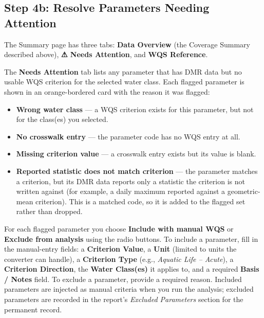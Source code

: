\documentclass[
  11pt,
  letterpaper,
  DIV=11,
  numbers=noendperiod]{scrartcl}
\providecommand{\tightlist}{%
  \setlength{\itemsep}{0pt}\setlength{\parskip}{0pt}}
\begin{document}
\subsection{Step 4b: Resolve Parameters Needing
Attention}\label{sec-needs-attention}

The Summary page has three tabs: \textbf{Data Overview} (the Coverage
Summary described above), \textbf{⚠ Needs Attention}, and \textbf{WQS
Reference}.

The \textbf{Needs Attention} tab lists any parameter that has DMR data
but no usable WQS criterion for the selected water class. Each flagged
parameter is shown in an orange-bordered card with the reason it was
flagged:

\begin{itemize}
\tightlist
\item
  \textbf{Wrong water class} --- a WQS criterion exists for this
  parameter, but not for the class(es) you selected.
\item
  \textbf{No crosswalk entry} --- the parameter code has no WQS entry at
  all.
\item
  \textbf{Missing criterion value} --- a crosswalk entry exists but its
  value is blank.
\item
  \textbf{Reported statistic does not match criterion} --- the parameter
  matches a criterion, but its DMR data reports only a statistic the
  criterion is not written against (for example, a daily maximum
  reported against a geometric-mean criterion). This is a matched code,
  so it is added to the flagged set rather than dropped.
\end{itemize}

For each flagged parameter you choose \textbf{Include with manual WQS}
or \textbf{Exclude from analysis} using the radio buttons. To include a
parameter, fill in the manual-entry fields: a \textbf{Criterion Value},
a \textbf{Unit} (limited to units the converter can handle), a
\textbf{Criterion Type} (e.g., \emph{Aquatic Life -- Acute}), a
\textbf{Criterion Direction}, the \textbf{Water Class(es)} it applies
to, and a required \textbf{Basis / Notes} field. To exclude a parameter,
provide a required reason. Included parameters are injected as manual
criteria when you run the analysis; excluded parameters are recorded in
the report's \emph{Excluded Parameters} section for the permanent
record.
\end{document}
